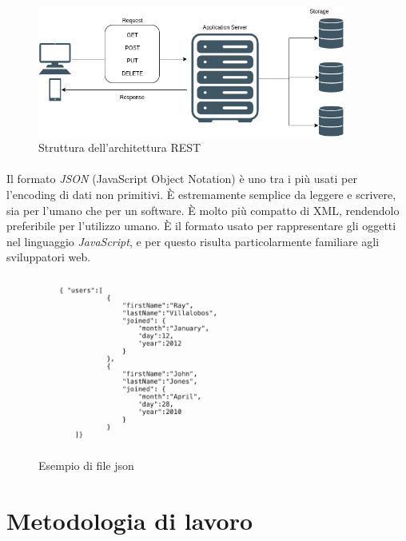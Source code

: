 \documentclass[12pt,a4paper,twoside,english,italian]{book}
\begin{document}
\begin{figure}[H]
    \centering
    \includegraphics[width=0.9\textwidth]{img/rest.png}
    \caption{Struttura dell'architettura REST}
\end{figure}

\paragraph{} Il formato \emph{JSON} \cite{json} (JavaScript Object Notation) è uno tra i più usati per l'encoding di dati non primitivi. È estremamente semplice da leggere e scrivere, sia per l'umano che per un software. È molto più compatto di XML, rendendolo preferibile per l'utilizzo umano. È il formato usato per rappresentare gli oggetti nel linguaggio \emph{JavaScript}, e per questo risulta particolarmente familiare agli sviluppatori web. 

\begin{figure}[H]
    \centering
    \includegraphics[width=0.6\textwidth]{img/json.jpeg}
    \caption{Esempio di file json}
\end{figure}


\section{Metodologia di lavoro}
\end{document}
